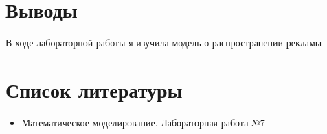\documentclass[
  english,
  russian,
  12pt,
  a4paper,
  DIV=11,
  numbers=noendperiod]{scrreprt}
\providecommand{\tightlist}{%
  \setlength{\itemsep}{0pt}\setlength{\parskip}{0pt}}
\begin{document}
\chapter{Выводы}\label{ux432ux44bux432ux43eux434ux44b}

В ходе лабораторной работы я изучила модель о распространении рекламы

\chapter*{Список
литературы}\label{ux441ux43fux438ux441ux43eux43a-ux43bux438ux442ux435ux440ux430ux442ux443ux440ux44b}

\begin{itemize}
\tightlist
\item
  Математическое моделирование. Лабораторная работа №7
\end{itemize}

\printbibliography[heading=none]
\end{document}
